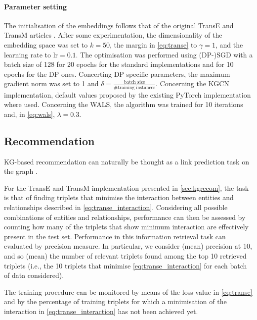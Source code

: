 \paragraph{Parameter setting} The initialisation of the embeddings follows that of the original TransE and TransM articles \parencite{bordes2013translating, fan2014transition}.
After some experimentation, the dimensionality of the embedding space was set to $k=50$, the margin in \cref{eq:transe} to $\gamma =1$, and the learning rate to $\text{lr} = 0.1$.
The optimisation was performed using (DP-)SGD with a batch size of \num{128} for \num{20} epochs for the standard implementations and for \num{10} epochs for the DP ones.
Concerting DP specific parameters, the maximum gradient norm was set to \num{1} and $\delta = \frac{\text{batch size}}{\text{\# training instances}}$.
Concerning the KGCN implementation, default values proposed by the existing PyTorch implementation where used.
Concerning the WALS, the algorithm was trained for 10 iterations and, in \cref{eq:wals}, $\lambda = 0.3$.



\subsection{Recommendation}

KG-based recommendation can naturally be thought as a link prediction task on the graph \parencite{guo2020survey}.

For the TransE and TransM implementation presented in \cref{sec:kgrecom}, the task is that of finding triplets that minimise the interaction between entities and relationships described in \cref{eq:transe_interaction}.
Considering all possible combinations of entities and relationships, performance can then be assessed by counting how many of the triplets that show minimum interaction are effectively present in the test set. 
Performance in this information retrieval task can evaluated by precision measure.
In particular, we consider (mean) precision at 10, and so (mean) the number of relevant triplets found among the top 10 retrieved triplets (i.e., the 10 triplets that minimise \cref{eq:transe_interaction} for each batch of data considered).

The training procedure can be monitored by means of the loss value in \cref{eq:transe} and by the percentage of training triplets for which a minimisation of the interaction in \cref{eq:transe_interaction} has not been achieved yet.

